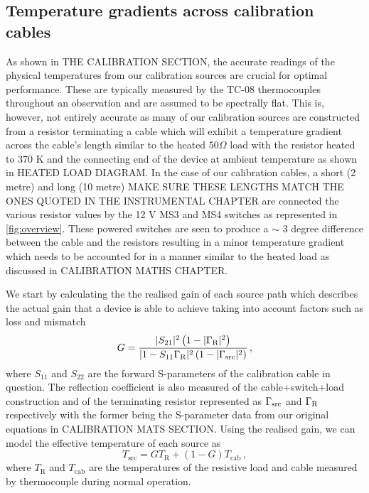 \subsection{Temperature gradients across calibration cables}\label{sec:cable_gradient}
As shown in THE CALIBRATION SECTION, the accurate readings of the physical temperatures from our calibration sources are crucial for optimal performance. These are typically measured by the TC-08 thermocouples throughout an observation and are assumed to be spectrally flat. This is, however, not entirely accurate as many of our calibration sources are constructed from a resistor terminating a cable which will exhibit a temperature gradient across the cable’s length similar to the heated $50 \Omega$ load with the resistor heated to 370 K and the connecting end of the device at ambient temperature as shown in HEATED LOAD DIAGRAM. In the case of our calibration cables, a short (2 metre) and long (10 metre) MAKE SURE THESE LENGTHS MATCH THE ONES QUOTED IN THE INSTRUMENTAL CHAPTER are connected the various resistor values by the 12 V MS3 and MS4 switches as represented in \cref{fig:overview}. These powered switches are seen to produce a $\sim$ 3 degree difference between the cable and the resistors resulting in a minor temperature gradient which needs to be accounted for in a manner similar to the heated load as discussed in CALIBRATION MATHS CHAPTER.

We start by calculating the the realised gain of each source path which describes the actual gain that a device is able to achieve taking into account factors such as loss and mismatch
\begin{equation}
    G = \frac{ |S_{21}|^2 \left( 1 - |\Gamma_{\mathrm{\mathrm{R}}}|^2 \right) }{ |1 - S_{11} \Gamma_{\mathrm{\mathrm{R}}}|^2 \left( 1 - |\Gamma_{\mathrm{\mathrm{src}}}|^2 \right) } \,,
    \label{eqn:av_gain}
\end{equation}
where $S_{11}$ and $S_{22}$ are the forward S-parameters of the calibration cable in question. The reflection coefficient is also measured of the cable+switch+load construction and of the terminating resistor represented as $\Gamma_{\mathrm{\mathrm{src}}}$ and $\Gamma_{\mathrm{\mathrm{R}}}$ respectively with the former being the S-parameter data from our original equations in CALIBRATION MATS SECTION. Using the realised gain, we can model the effective temperature of each source as
\begin{equation}
    T_{\mathrm{src}} = GT_{\mathrm{R}} + (1 - G)T_{\mathrm{cab}} \,,
    \label{eqn:temp_correction}
\end{equation}
where $T_{\mathrm{R}}$ and $T_{\mathrm{cab}}$ are the temperatures of the resistive load and cable measured by thermocouple during normal operation. 

